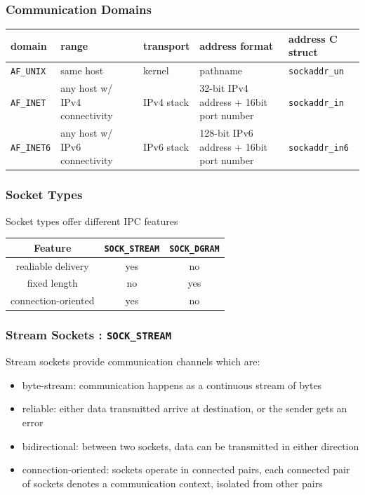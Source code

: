\documentclass[newPxFont,sthlmFooter,nooffset]{beamer}
\begin{document}
\begin{frame}[t, fragile]
  \frametitle{Communication Domains}
  \begin{table}
    \centering
    \begin{tabular}{m{1.5cm} | m{2cm} | m{2cm} | m{2cm} | m{2cm}}
      domain & range & transport & address format & address C struct \\ \hline
      \texttt{AF\_UNIX} & same host & kernel & pathname & \texttt{sockaddr\_un} \\ \hline
      \texttt{AF\_INET} & any host w/ IPv4 connectivity & IPv4 stack & 32-bit IPv4 address + 16bit port number & \texttt{sockaddr\_in} \\ \hline
      \texttt{AF\_INET6} & any host w/ IPv6 connectivity & IPv6 stack & 128-bit IPv6 address + 16bit port number  & \texttt{sockaddr\_in6} \\
    \end{tabular}
  \end{table}

\end{frame}


\begin{frame}[t, fragile]
  \frametitle{Socket Types}
Socket types offer different IPC features

\begin{table}
  \centering
  \begin{tabular}{c | c | c}
    Feature & \texttt{SOCK\_STREAM} & \texttt{SOCK\_DGRAM} \\ \hline
    realiable delivery & yes & no \\ \hline
    fixed length & no & yes \\ \hline
    connection-oriented & yes & no \\ 
  \end{tabular}
\end{table}
\end{frame}


\begin{frame}[t, fragile]
  \frametitle{Stream Sockets : \texttt{SOCK\_STREAM}}
Stream sockets provide communication channels which are: 
\begin{itemize}
\item byte-stream: communication happens as a continuous stream of bytes
\item reliable: either data transmitted arrive at destination, or the sender gets an error
\item bidirectional: between two sockets, data can be transmitted in either direction
\item connection-oriented: sockets operate in connected pairs, each connected pair of sockets denotes a communication context, isolated from other pairs
\end{itemize}

\end{frame}
\end{document}
